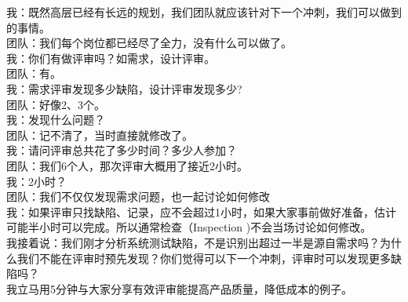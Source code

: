 
我：既然高层已经有长远的规划，我们团队就应该针对下一个冲刺，我们可以做到的事情。\\
团队：我们每个岗位都已经尽了全力，没有什么可以做了。\\
我：你们有做评审吗？如需求，设计评审。\\
团队：有。\\
我：需求评审发现多少缺陷，设计评审发现多少?\\
团队：好像2、3个。\\
我：发现什么问题？\\
团队：记不清了，当时直接就修改了。\\
我：请问评审总共花了多少时间？多少人参加？\\
团队：我们6个人，那次评审大概用了接近2小时。\\
我：2小时？\\
团队：我们不仅仅发现需求问题，也一起讨论如何修改\\
我：如果评审只找缺陷、记录，应不会超过1小时，如果大家事前做好准备，估计可能半小时可以完成。所以通常检查（Inspection
)不会当场讨论如何修改。\\
我接着说：我们刚才分析系统测试缺陷，不是识别出超过一半是源自需求吗？为什么我们不能在评审时预先发现？你们觉得可以下一个冲刺，评审时可以发现更多缺陷吗？\\
我立马用5分钟与大家分享有效评审能提高产品质量，降低成本的例子。

